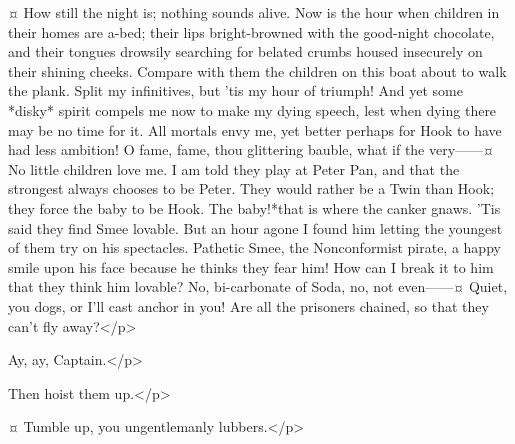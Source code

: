 \begin{drama}

\hookspeaks {}¤
How still the night is; nothing sounds alive.
Now is the hour when children in their homes are a-bed;
their lips bright-browned with the good-night chocolate,
and their tongues drowsily searching for belated crumbs housed insecurely on their shining cheeks.
Compare with them the children on this boat about to walk the plank.
Split my infinitives, but 'tis my hour of triumph!
And yet some *disky* spirit compels me now to make my dying speech, lest when dying there may be no time for it.
All mortals envy me, yet better perhaps for Hook to have had less ambition!
O fame, fame, thou glittering bauble, what if the very——¤
No little children love me.
I am told they play at Peter Pan, and that the strongest always chooses to be Peter.
They would rather be a Twin than Hook; they force the baby to be Hook.
The baby!\@ *that is where the canker gnaws.
'Tis said they find Smee lovable.
But an hour agone I found him letting the youngest of them try on his spectacles.
Pathetic Smee, the Nonconformist pirate, a happy smile upon his face because he thinks they fear him!
How can I break it to him that they think him lovable?
No, bi-carbonate of Soda, no, not even——¤
Quiet, you dogs, or I'll cast anchor in you!
Are all the prisoners chained, so that they can't fly away?</p>

\jukesspeaks
Ay, ay, Captain.</p>

\hookspeaks
Then hoist them up.</p>

\starkeyspeaks {}¤
Tumble up, you ungentlemanly lubbers.</p>


\end{drama}
